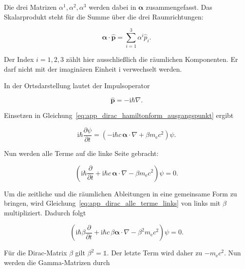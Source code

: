 Die drei Matrizen \(\alpha^1,\alpha^2,\alpha^3\) werden dabei in
\(\boldsymbol{\alpha}\) zusammengefasst. Das Skalarprodukt steht für die
Summe über die drei Raumrichtungen:

\begin{equation}
	\boldsymbol{\alpha}\cdot\hat{\mathbf p}
	=
	\sum_{i=1}^{3}\alpha^i\hat{p}_i.
	\label{eq:app_alpha_impuls_summe}
\end{equation}

Der Index \(i=1,2,3\) zählt hier ausschließlich die räumlichen
Komponenten. Er darf nicht mit der imaginären Einheit \(\mathrm{i}\)
verwechselt werden.

In der Ortsdarstellung lautet der Impulsoperator

\begin{equation}
	\hat{\mathbf p}
	=
	-\mathrm{i}\hbar\nabla.
	\label{eq:app_impulsoperator_dirac_kovariant}
\end{equation}

Einsetzen in Gleichung~\eqref{eq:app_dirac_hamiltonform_ausgangspunkt}
ergibt

\begin{equation}
	\mathrm{i}\hbar
	\frac{\partial\psi}{\partial t}
	=
	\left(
	-\mathrm{i}\hbar c\,
	\boldsymbol{\alpha}\cdot\nabla
	+
	\beta m_{\mathrm e}c^2
	\right)
	\psi.
	\label{eq:app_dirac_hamiltonform_ableitungen}
\end{equation}

Nun werden alle Terme auf die linke Seite gebracht:

\begin{equation}
	\left(
	\mathrm{i}\hbar\frac{\partial}{\partial t}
	+
	\mathrm{i}\hbar c\,
	\boldsymbol{\alpha}\cdot\nabla
	-
	\beta m_{\mathrm e}c^2
	\right)
	\psi
	=
	0.
	\label{eq:app_dirac_alle_terme_links}
\end{equation}

Um die zeitliche und die räumlichen Ableitungen in eine gemeinsame Form
zu bringen, wird Gleichung~\eqref{eq:app_dirac_alle_terme_links} von links
mit \(\beta\) multipliziert. Dadurch folgt

\begin{equation}
	\left(
	\mathrm{i}\hbar\beta\frac{\partial}{\partial t}
	+
	\mathrm{i}\hbar c\,
	\beta\boldsymbol{\alpha}\cdot\nabla
	-
	\beta^2m_{\mathrm e}c^2
	\right)
	\psi
	=
	0.
	\label{eq:app_dirac_mit_beta_multipliziert}
\end{equation}

Für die Dirac-Matrix \(\beta\) gilt \(\beta^2=\mathbb{1}\). Der letzte
Term wird daher zu \(-m_{\mathrm e}c^2\). Nun werden die
Gamma-Matrizen durch

